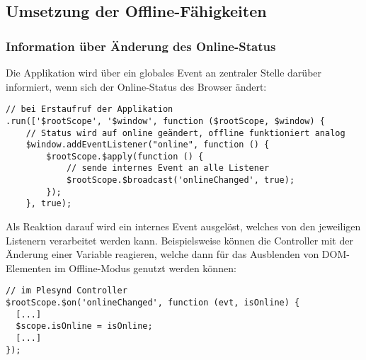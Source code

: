 \subsection{Umsetzung der Offline-Fähigkeiten}\label{section:offline_faehigkeiten}

\subsubsection*{Information über Änderung des Online-Status}
Die Applikation wird über ein globales Event an zentraler Stelle darüber informiert, wenn sich der Online-Status des Browser ändert:
\begin{lstlisting}
// bei Erstaufruf der Applikation
.run(['$rootScope', '$window', function ($rootScope, $window) {
    // Status wird auf online geändert, offline funktioniert analog
    $window.addEventListener("online", function () {
        $rootScope.$apply(function () {
            // sende internes Event an alle Listener
            $rootScope.$broadcast('onlineChanged', true);
        });
    }, true);
\end{lstlisting}

Als Reaktion darauf wird ein internes Event ausgelöst, welches von den jeweiligen Listenern verarbeitet werden kann. Beispielsweise können die Controller mit der Änderung einer Variable reagieren, welche dann für das Ausblenden von DOM-Elementen im Offline-Modus genutzt werden können:
\begin{lstlisting}
// im Plesynd Controller
$rootScope.$on('onlineChanged', function (evt, isOnline) {
  [...]
  $scope.isOnline = isOnline;
  [...]
});
\end{lstlisting}

